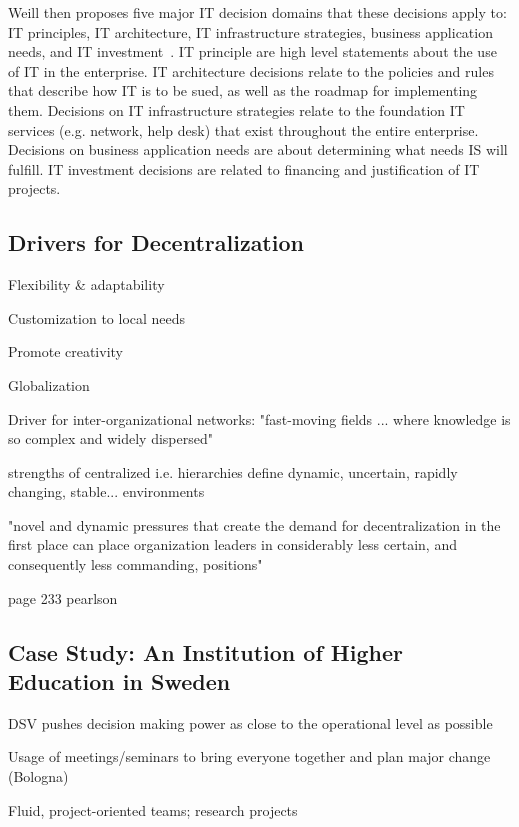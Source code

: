 Weill then proposes five major IT decision domains that these decisions apply to: IT principles, IT architecture, IT infrastructure strategies, business application needs, and IT investment~\cite{Weill2004}. IT principle are high level statements about the use of IT in the enterprise. IT architecture decisions relate to the policies and rules that describe how IT is to be sued, as well as the roadmap for implementing them. Decisions on IT infrastructure strategies relate to the foundation IT services (e.g. network, help desk) that exist throughout the entire enterprise.  Decisions on business application needs are about determining what needs IS will fulfill. IT investment decisions are related to financing and justification of IT projects.



\subsection{Drivers for Decentralization}

Flexibility \& adaptability

Customization to local needs

Promote creativity

Globalization

Driver for inter-organizational networks: "fast-moving fields ... where knowledge is so complex and widely dispersed"~\cite{Bolman2008}

strengths of centralized i.e. hierarchies
define dynamic, uncertain, rapidly changing, stable... environments

"novel and dynamic pressures that create the demand for decentralization in the first place can place organization leaders in considerably less certain, and consequently less commanding, positions"

page 233 pearlson


\subsection{Case Study: An Institution of Higher Education in Sweden}

DSV pushes decision making power as close to the operational level as possible

Usage of meetings/seminars to bring everyone together and plan major change (Bologna)

Fluid, project-oriented teams; research projects

